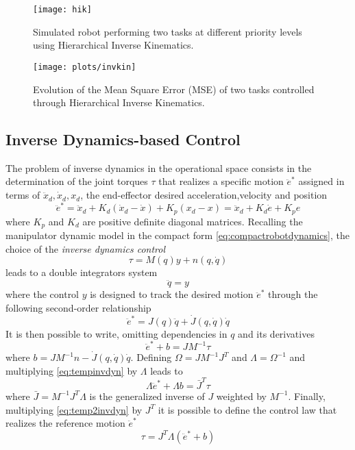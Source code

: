 \begin{figure}[H]
\centering
\texttt{[image: hik]}
\caption{Simulated robot performing two tasks at different priority levels using Hierarchical Inverse Kinematics.}
\end{figure}
\begin{figure}[H]
\centering
\texttt{[image: plots/invkin]}
\caption{Evolution of the Mean Square Error (MSE) of two tasks controlled through Hierarchical Inverse Kinematics.}
\end{figure}

\subsection{Inverse Dynamics-based Control}
The problem of inverse dynamics in the operational space consists in the determination of the joint torques $\tau$ that realizes a specific motion $\ddot{e}^*$ assigned in terms of $\ddot{x}_d,\dot{x}_d,x_d$, the end-effector desired acceleration,velocity and position
\begin{equation}
\ddot{e}^* = \ddot{x}_d + K_d(\dot{x}_d - \dot{x}) + K_p(x_d - x) = 
\ddot{x}_d + K_{d}\dot{e} + K_{p}e
\end{equation}
where $K_p$ and $K_d$ are positive definite diagonal matrices. Recalling the manipulator dynamic model in the compact form \eqref{eq:compactrobotdynamics}, the choice of the \textit{inverse dynamics control}
\begin{equation}
\tau = M(q)y + n(q,\dot{q})
\end{equation}
leads to a double integrators system
\begin{equation*}
\ddot{q} = y
\end{equation*}
where the control $y$ is designed to track the desired motion $\ddot{e}^*$ through the following second-order relationship
\begin{equation}
\ddot{e}^* = J(q)\ddot{q} + \dot{J}(q,\dot{q})\dot{q}
\end{equation}
It is then possible to write, omitting dependencies in $q$ and its derivatives
\begin{equation}
\ddot{e}^* + b = JM^{-1}\tau
\label{eq:tempinvdyn}
\end{equation}
where $b = JM^{-1}n - \dot{J}(q,\dot{q})\dot{q}$.
Defining $\Omega = JM^{-1}J^T$ and $\Lambda = \Omega^{-1}$ and multiplying \eqref{eq:tempinvdyn} by $\Lambda$ leads to
\begin{equation}
\Lambda\ddot{e}^* + {\Lambda}b = \bar{J}^T\tau
\label{eq:temp2invdyn}
\end{equation}
where $\bar{J} = M^{-1}J^T\Lambda$ is the generalized inverse of $J$ weighted by $M^{-1}$. Finally, multiplying \eqref{eq:temp2invdyn} by $J^T$ it is possible to define the control law that realizes the reference motion $\ddot{e}^*$
\begin{equation}
\tau = J^T\Lambda(\ddot{e}^* + b)
\label{eq:onetaskinversedynamics}
\end{equation}

